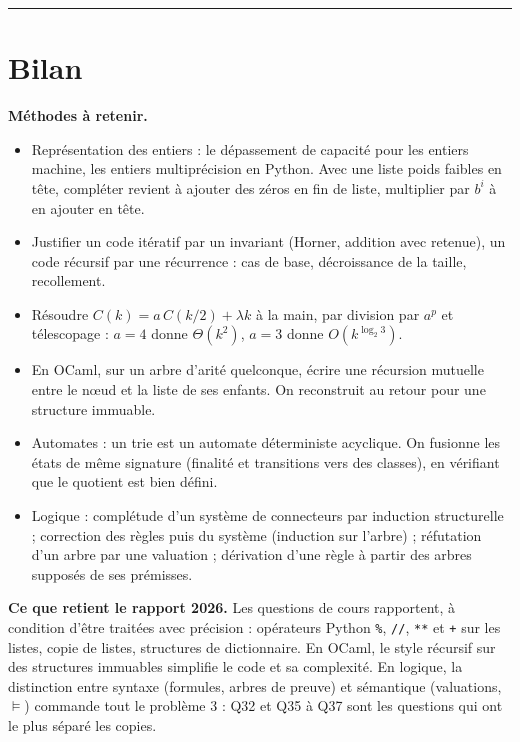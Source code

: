 \documentclass[11pt,a4paper]{article}
\providecommand{\tightlist}{\setlength{\itemsep}{0pt}\setlength{\parskip}{0pt}}
\begin{document}
\begin{center}\rule{0.5\linewidth}{0.5pt}\end{center}

\hypertarget{bilan}{%
\section{Bilan}\label{bilan}}

\textbf{Méthodes à retenir.}

\begin{itemize}
\tightlist
\item
  Représentation des entiers : le dépassement de capacité pour les entiers machine, les entiers multiprécision en Python. Avec une liste poids faibles en tête, compléter revient à ajouter des zéros en fin de liste, multiplier par \(b^i\) à en ajouter en tête.
\item
  Justifier un code itératif par un invariant (Horner, addition avec retenue), un code récursif par une récurrence : cas de base, décroissance de la taille, recollement.
\item
  Résoudre \(C(k) = a\,C(k/2) + \lambda k\) à la main, par division par \(a^p\) et télescopage : \(a = 4\) donne \(\Theta(k^2)\), \(a = 3\) donne \(O(k^{\log_2 3})\).
\item
  En OCaml, sur un arbre d'arité quelconque, écrire une récursion mutuelle entre le nœud et la liste de ses enfants. On reconstruit au retour pour une structure immuable.
\item
  Automates : un trie est un automate déterministe acyclique. On fusionne les états de même signature (finalité et transitions vers des classes), en vérifiant que le quotient est bien défini.
\item
  Logique : complétude d'un système de connecteurs par induction structurelle ; correction des règles puis du système (induction sur l'arbre) ; réfutation d'un arbre par une valuation ; dérivation d'une règle à partir des arbres supposés de ses prémisses.
\end{itemize}

\textbf{Ce que retient le rapport 2026.} Les questions de cours rapportent, à condition d'être traitées avec précision : opérateurs Python \texttt{\%}, \texttt{//}, \texttt{**} et \texttt{+} sur les listes, copie de listes, structures de dictionnaire. En OCaml, le style récursif sur des structures immuables simplifie le code et sa complexité. En logique, la distinction entre syntaxe (formules, arbres de preuve) et sémantique (valuations, \(\models\)) commande tout le problème 3 : Q32 et Q35 à Q37 sont les questions qui ont le plus séparé les copies.
\end{document}
